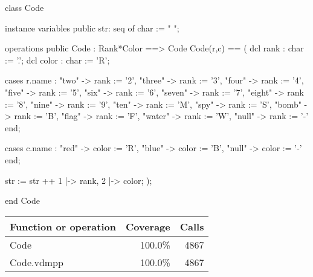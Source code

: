 \begin{vdm_al}
class Code

 instance variables
  public str: seq of char := "  ";
 
 operations
  public Code : Rank*Color ==> Code
  Code(r,c) ==
  (
   dcl rank : char := '.';
   dcl color : char := 'R';
    
   cases r.name :
     "two" -> rank := '2',
     "three" -> rank := '3',
     "four" -> rank := '4',
     "five" -> rank := '5',
     "six" -> rank := '6',
     "seven" -> rank := '7',
     "eight" -> rank := '8',
     "nine" -> rank := '9',
     "ten" -> rank := 'M',
     "spy" -> rank := 'S',
     "bomb" -> rank := 'B',
     "flag" -> rank := 'F',
     "water" -> rank := 'W',
     "null" -> rank := '-'
    end;
    
   cases c.name :
     "red" -> color := 'R',
     "blue" -> color := 'B',
     "null" -> color := '-'
    end;
    
   str := str ++ {1 |-> rank, 2 |-> color};
  );
  
end Code
\end{vdm_al}
\bigskip
\begin{longtable}{|l|r|r|}
\hline
Function or operation & Coverage & Calls \\
\hline
\hline
Code & 100.0\% & 4867 \\
\hline
\hline
Code.vdmpp & 100.0\% & 4867 \\
\hline
\end{longtable}


